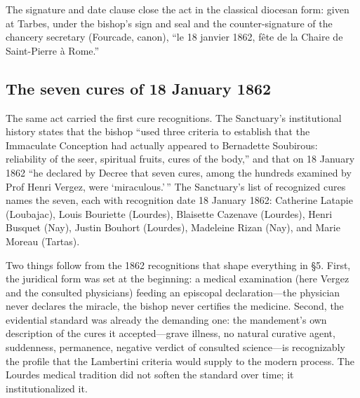 The signature and date clause close the act in the classical
diocesan form: given at Tarbes, under the bishop's sign and seal
and the counter-signature of the chancery secretary (Fourcade,
canon), ``le 18 janvier 1862, f\^ete de la Chaire de Saint-Pierre
\`a Rome.''

\subsection{The seven cures of 18 January 1862}

The same act carried the first cure recognitions. The Sanctuary's
institutional history states that the bishop ``used three criteria
to establish that the Immaculate Conception had actually appeared
to Bernadette Soubirous: reliability of the seer, spiritual
fruits, cures of the body,'' and that on 18 January 1862 ``he
declared by Decree that seven cures, among the hundreds examined
by Prof Henri Vergez, were `miraculous.'\,'' The
Sanctuary's list of recognized cures names the seven, each with
recognition date 18 January 1862: Catherine Latapie (Loubajac),
Louis Bouriette (Lourdes), Blaisette Cazenave (Lourdes), Henri
Busquet (Nay), Justin Bouhort (Lourdes), Madeleine Rizan (Nay),
and Marie Moreau (Tartas).

Two things follow from the 1862 recognitions that shape everything
in \S5. First, the juridical form was set at the beginning: a
medical examination (here Vergez and the consulted physicians)
feeding an episcopal declaration---the physician never declares
the miracle, the bishop never certifies the medicine. Second, the
evidential standard was already the demanding one: the mandement's
own description of the cures it accepted---grave illness, no
natural curative agent, suddenness, permanence, negative verdict
of consulted science---is recognizably the profile that the
Lambertini criteria would supply to the modern process. The
Lourdes medical tradition did not soften the standard over time;
it institutionalized it.
